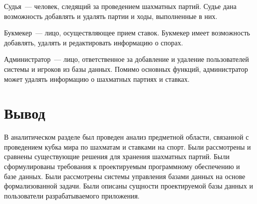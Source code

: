Судья~--- человек, следящий за проведением шахматных партий. Судье дана возможность добавлять и удалять партии и ходы, выполненные в них.

Букмекер~--- лицо, осуществляющее прием ставок. Букмекер имеет возможность добавлять, удалять и редактировать информацию о спорах.

Администратор~--- лицо, ответственное за добавление и удаление пользователей системы и игроков из базы данных. Помимо основных функций, администратор может удалять информацию о шахматных партиях и ставках.

\section*{Вывод}

В аналитическом разделе был проведен анализ предметной области, связанной с проведением кубка мира по шахматам и ставками на спорт. Были рассмотрены и сравнены существующие решения для хранения шахматных партий. Были сформулированы требования к проектируемым программному обеспечению и базе данных. Были рассмотрены системы управления базами данных на основе формализованной задачи. Были описаны сущности проектируемой базы данных и пользователи разрабатываемого приложения.

\clearpage
